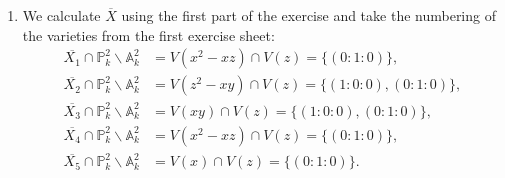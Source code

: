 \begin{exercise}{1}
\begin{enumerate}



        \item{} We calculate $\overline{X}$ using the first part of the exercise and take the numbering of the
        varieties from the first exercise sheet:\\
        \begin{align*}
            \overline{X_1}\cap \mathbb{P}^2_k \backslash
            \mathbb{A}^2_k&=V(x^2-xz)\cap V(z)=\{(0:1:0)\},\\
            \overline{X_2}\cap \mathbb{P}^2_k \backslash
            \mathbb{A}^2_k&=V(z^2-xy)\cap V(z)=\{(1:0:0), (0:1:0)\},\\
            \overline{X_3}\cap \mathbb{P}^2_k \backslash
            \mathbb{A}^2_k&=V(xy)\cap V(z)=\{(1:0:0), (0:1:0)\},\\
            \overline{X_4}\cap \mathbb{P}^2_k \backslash
            \mathbb{A}^2_k&=V(x^2-xz)\cap V(z)=\{(0:1:0)\},\\
            \overline{X_5}\cap \mathbb{P}^2_k \backslash
            \mathbb{A}^2_k&=V(x)\cap V(z)= \{(0:1:0)\}.
        \end{align*}


\end{enumerate}
\end{exercise}
